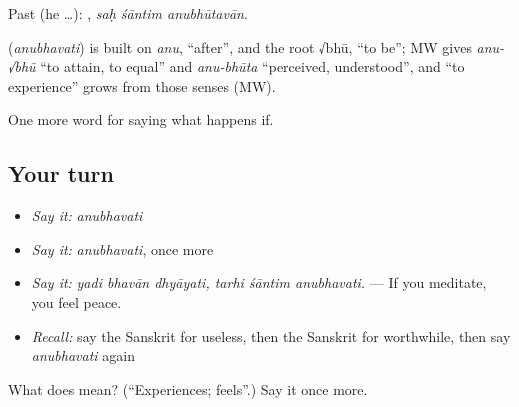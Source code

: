 Past (he …):   , \emph{saḥ śāntim anubhūtavān}.

\begin{cousinweb}
\textbf{} (\emph{anubhavati}) is built on \emph{anu}, \textquotedblleft{}after\textquotedblright{}, and the root √bhū, \textquotedblleft{}to be\textquotedblright{}; MW gives \emph{anu-√bhū} \textquotedblleft{}to attain, to equal\textquotedblright{} and \emph{anu-bhūta} \textquotedblleft{}perceived, understood\textquotedblright{}, and \textquotedblleft{}to experience\textquotedblright{} grows from those senses (MW).
\end{cousinweb}

\begin{grammarlens}[title={What you've built}]
One more word for saying what happens if.
\end{grammarlens}

\subsection*{Your turn}
\begin{itemize}
\raggedright
  \item \emph{Say it:} \emph{anubhavati}
  \item \emph{Say it:} \emph{anubhavati}, once more
  \item \emph{Say it:} \emph{yadi bhavān dhyāyati, tarhi śāntim anubhavati.} — If you meditate, you feel peace.
  \item \emph{Recall:} say the Sanskrit for useless, then the Sanskrit for worthwhile, then say \emph{anubhavati} again
\end{itemize}

\begin{tcolorbox}[breakable,colback=teal!4,colframe=teal!35!black,title={Before you move on}]
What does  mean? (\textquotedblleft{}Experiences; feels\textquotedblright{}.) Say it once more.
\end{tcolorbox}
